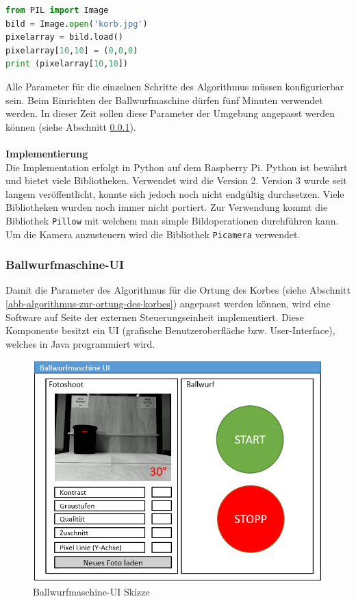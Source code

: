\begin{lstlisting}[language=Python,caption={Pixel aus einem Bild auslesen mit Python},label=lst:image_python]
from PIL import Image
bild = Image.open('korb.jpg')
pixelarray = bild.load()
pixelarray[10,10] = (0,0,0)
print (pixelarray[10,10])
\end{lstlisting}


Alle Parameter für die einzelnen Schritte des Algorithmus müssen konfigurierbar sein. Beim Einrichten der Ballwurfmaschine dürfen fünf Minuten verwendet werden. In dieser Zeit sollen diese Parameter der Umgebung angepasst werden können (siehe Abschnitt \ref{ss-config-paramater-ortung-orb}).\\
\\
\textbf{Implementierung}\\
Die Implementation erfolgt in Python auf dem Raspberry Pi. Python ist bewährt und bietet viele Bibliotheken. Verwendet wird die Version 2. Version 3 wurde seit langem veröffentlicht, konnte sich jedoch noch nicht endgültig durchsetzen. Viele Bibliotheken wurden noch immer nicht portiert. Zur Verwendung kommt die Bibliothek \verb|Pillow| mit welchem man simple Bildoperationen durchführen kann. Um die Kamera anzusteuern wird die Bibliothek \verb|Picamera| verwendet.

\subsubsection{Ballwurfmaschine-UI}
\label{ss-config-paramater-ortung-orb}
Damit die Parameter des Algorithmus für die Ortung des Korbes (siehe Abschnitt \ref{abb-algorithmus-zur-ortung-des-korbes}) angepasst werden können, wird eine Software auf Seite der externen Steuerungseinheit implementiert. Diese Komponente besitzt ein UI (grafische Benutzeroberfläche bzw. User-Interface), welches in Java programmiert wird.

\begin{figure}[h!]
	\centering
	\includegraphics[scale=0.75]{../../fig/fotoshoot-configurator.png}
	\caption{Ballwurfmaschine-UI Skizze}
\end{figure}

